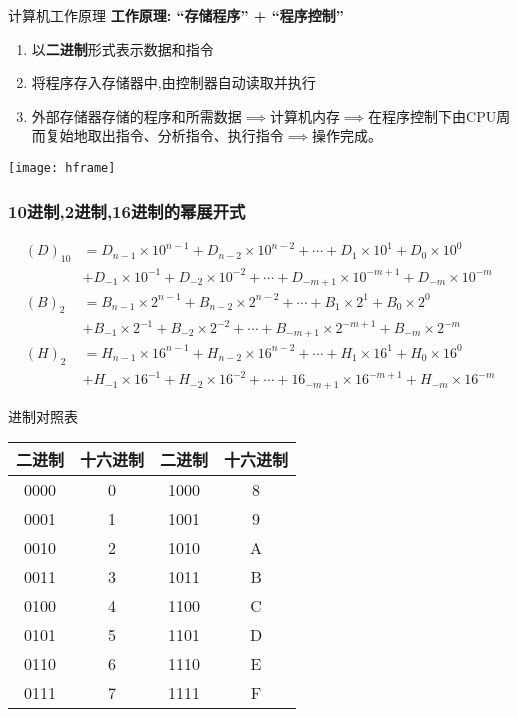 \begin{frame}{计算机工作原理}
\textbf{工作原理: ``存储程序'' + ``程序控制''}
\begin{enumerate}
	\item 以\textbf{二进制}形式表示数据和指令
	\item 将程序存入存储器中,由控制器自动读取并执行
	\item 外部存储器存储的程序和所需数据$\implies$计算机内存$\implies$在程序控制下由CPU周而复始地取出指令、分析指令、执行指令$\implies$操作完成。	
\end{enumerate}
\texttt{[image: hframe]}
\end{frame}

\begin{frame}[shrink]
\frametitle{10进制,2进制,16进制的幂展开式}
\begin{align*}
(D)_{10}&=D_{n-1}\times 10^{n-1}+D_{n-2}\times 10^{n-2}+\cdots+D_{1}\times 10^{1}+D_{0}\times 10^{0}\\
&+D_{-1}\times 10^{-1}+D_{-2}\times 10^{-2}+\cdots+D_{-m+1}\times 10^{-m+1}+D_{-m}\times 10^{-m}\\
(B)_{2}&=B_{n-1}\times 2^{n-1}+B_{n-2}\times 2^{n-2}+\cdots+B_{1}\times 2^{1}+B_{0}\times 2^{0}\\
&+B_{-1}\times 2^{-1}+B_{-2}\times 2^{-2}+\cdots+B_{-m+1}\times 2^{-m+1}+B_{-m}\times 2^{-m}\\
(H)_{2}&=H_{n-1}\times 16^{n-1}+H_{n-2}\times 16^{n-2}+\cdots+H_{1}\times 16^{1}+H_{0}\times 16^{0}\\
&+H_{-1}\times 16^{-1}+H_{-2}\times 16^{-2}+\cdots+16_{-m+1}\times 16^{-m+1}+H_{-m}\times 16^{-m}
\end{align*}
\end{frame}

\begin{frame}{进制对照表}
\begin{tabular}{|c|c||c|c|}
	\hline 
	二进制 & 十六进制 & 二进制 & 十六进制 \\ 
	\hline 
	0000 &  0 & 1000  & 8 \\ 
	\hline 
	0001 &  1 & 1001  & 9 \\ 
	\hline 
	0010 &  2 & 1010  & A \\ 
	\hline 
	0011 &  3 & 1011  & B \\ 
	\hline 
	0100 &  4 & 1100  & C \\ 
	\hline 
	0101 &  5 & 1101  & D \\ 
	\hline 
	0110 &  6 & 1110  & E \\ 
	\hline 
	0111 &  7 & 1111  & F \\ 
	\hline 
\end{tabular} 
\end{frame}

